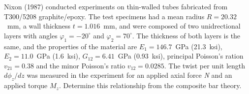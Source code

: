 \documentclass{AeroStructure-ERJohnson}
\begin{document}
\begin{example}\label{ex8.3}Nixon (1987) conducted experiments on thin-walled tubes fabricated
from T300/5208 graphite/epoxy. The test specimens had a mean
radius $R = 20.32$~mm, a wall thickness $t = 1.016$~mm, and were
composed of two unidrectional layers with angles
$\varphi_{1}=-20^{\circ}$ and $\varphi_{2}=70^{\circ}$. The
thickness of both layers is the same, and the properties of the
material are $E_1 = 146.7$~GPa (21.3~ksi), $E_2 = 11.0$~GPa
(1.6~ksi), $G_{12} = 6.41$~GPa (0.93~ksi), principal Poisson's
ration $v_{21}=0.38$ and the minor Poisson's ratio
$v_{12}=0.0285$. The twist per unit length $d \phi_{z}/ d z$ was
measured in the experiment for an applied axial force \textit{N}
and an applied torque $M_{z}$. Determine this relationship from
the composite bar theory.


\end{example}
\end{document}

